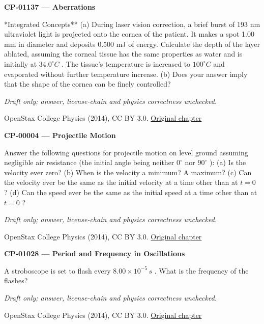 \par\medskip
\noindent\textbf{CP-01137 — Aberrations}
\par **Integrated Concepts** (a) During laser vision correction, a brief burst of 193 nm ultraviolet light is projected onto the cornea of the patient. It makes a spot 1.00 mm in diameter and deposits 0.500 mJ of energy. Calculate the depth of the layer ablated, assuming the corneal tissue has the same properties as water and is initially at $34.0^{\circ}C$ . The tissue’s temperature is increased to $100^{\circ}C$ and evaporated without further temperature increase. (b) Does your answer imply that the shape of the cornea can be finely controlled?
\par\smallskip
\textit{Draft only; answer, license-chain and physics correctness unchecked.}
\par{\footnotesize OpenStax College Physics (2014), CC BY 3.0. \href{https://github.com/philschatz/physics-book/blob/a7efaa7e221fab1694022d8bb98b83a73ee31d3d/contents/m42292.md}{Original chapter}}\par\normalsize

\par\medskip
\noindent\textbf{CP-00004 — Projectile Motion}
\par Answer the following questions for projectile motion on level ground assuming negligible air resistance (the initial angle being neither $0^{\circ}$ nor $90^{\circ}$ ): (a) Is the velocity ever zero? (b) When is the velocity a minimum? A maximum? (c) Can the velocity ever be the same as the initial velocity at a time other than at $t=0$ ? (d) Can the speed ever be the same as the initial speed at a time other than at $t=0$ ?
\par\smallskip
\textit{Draft only; answer, license-chain and physics correctness unchecked.}
\par{\footnotesize OpenStax College Physics (2014), CC BY 3.0. \href{https://github.com/philschatz/physics-book/blob/a7efaa7e221fab1694022d8bb98b83a73ee31d3d/contents/m42042.md}{Original chapter}}\par\normalsize

\par\medskip
\noindent\textbf{CP-01028 — Period and Frequency in Oscillations}
\par A stroboscope is set to flash every $8.00\times{}{10}^{-5}\,s$ . What is the frequency of the flashes?
\par\smallskip
\textit{Draft only; answer, license-chain and physics correctness unchecked.}
\par{\footnotesize OpenStax College Physics (2014), CC BY 3.0. \href{https://github.com/philschatz/physics-book/blob/a7efaa7e221fab1694022d8bb98b83a73ee31d3d/contents/m42241.md}{Original chapter}}\par\normalsize

